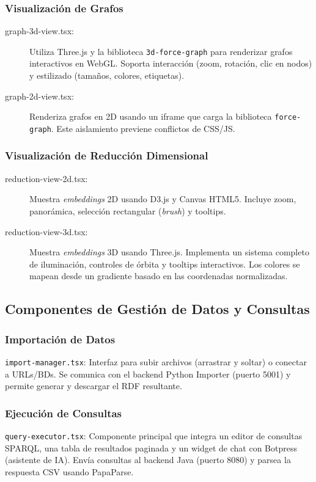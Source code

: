 \documentclass{article}
\begin{document}
\subsubsection{Visualización de Grafos}
\begin{description}
    \item[graph-3d-view.tsx:] Utiliza Three.js y la biblioteca \texttt{3d-force-graph} para renderizar grafos interactivos en WebGL. Soporta interacción (zoom, rotación, clic en nodos) y estilizado (tamaños, colores, etiquetas).
    \item[graph-2d-view.tsx:] Renderiza grafos en 2D usando un iframe que carga la biblioteca \texttt{force-graph}. Este aislamiento previene conflictos de CSS/JS.
\end{description}

\subsubsection{Visualización de Reducción Dimensional}
\begin{description}
    \item[reduction-view-2d.tsx:] Muestra \textit{embeddings} 2D usando D3.js y Canvas HTML5. Incluye zoom, panorámica, selección rectangular (\textit{brush}) y tooltips.
    \item[reduction-view-3d.tsx:] Muestra \textit{embeddings} 3D usando Three.js. Implementa un sistema completo de iluminación, controles de órbita y tooltips interactivos. Los colores se mapean desde un gradiente basado en las coordenadas normalizadas.
\end{description}

\subsection{Componentes de Gestión de Datos y Consultas}

\subsubsection{Importación de Datos}
\texttt{import-manager.tsx}: Interfaz para subir archivos (arrastrar y soltar) o conectar a URLs/BDs. Se comunica con el backend Python Importer (puerto 5001) y permite generar y descargar el RDF resultante.

\subsubsection{Ejecución de Consultas}
\texttt{query-executor.tsx}: Componente principal que integra un editor de consultas SPARQL, una tabla de resultados paginada y un widget de chat con Botpress (asistente de IA). Envía consultas al backend Java (puerto 8080) y parsea la respuesta CSV usando PapaParse.
\end{document}
